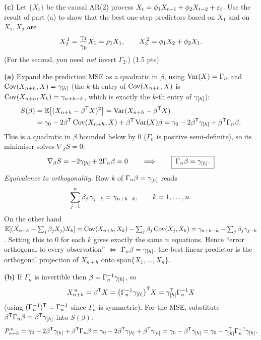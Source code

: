 \documentclass[11pt]{article}
\begin{document}
\textbf{(c)} Let $\{X_t\}$ be the causal AR(2) process $X_t=\phi_1 X_{t-1}+\phi_2 X_{t-2}+\varepsilon_t$. Use the result of part (a) to show that the best one-step predictors based on $X_1$ and on $X_1,X_2$ are
\[
X^{\,1}_2=\frac{\gamma_1}{\gamma_0}X_1=\rho_1 X_1,
\qquad
X^{\,2}_3=\phi_1 X_2+\phi_2 X_1 .
\]
(For the second, you need \emph{not} invert $\Gamma_2$.) \hfill(1.5 pts)
\statementend

\textbf{(a)} Expand the prediction MSE as a quadratic in $\beta$, using $\operatorname{Var}(X)=\Gamma_n$ and $\operatorname{Cov}(X_{n+h},X)=\gamma_{[h]}$ (the $k$-th entry of $\operatorname{Cov}(X_{n+h},X)$ is $\operatorname{Cov}(X_{n+h},X_k)=\gamma_{n+h-k}$, which is exactly the $k$-th entry of $\gamma_{[h]}$):
\[
\begin{aligned}
S(\beta)
&=\mathbb{E}\bigl[(X_{n+h}-\beta^{\mathsf{T}} X)^2\bigr]
=\operatorname{Var}(X_{n+h}-\beta^{\mathsf{T}} X)\\
&=\gamma_0-2\beta^{\mathsf{T}}\operatorname{Cov}(X_{n+h},X)+\beta^{\mathsf{T}}\operatorname{Var}(X)\beta
=\gamma_0-2\beta^{\mathsf{T}}\gamma_{[h]}+\beta^{\mathsf{T}}\Gamma_n\beta .
\end{aligned}
\]
This is a quadratic in $\beta$ bounded below by $0$ ($\Gamma_n$ is positive semi-definite), so its minimiser solves $\nabla_\beta S=0$:
\[
\nabla_\beta S=-2\gamma_{[h]}+2\Gamma_n\beta=0
\qquad\Longrightarrow\qquad
\boxed{\;\Gamma_n\beta=\gamma_{[h]}.\;}
\]
\emph{Equivalence to orthogonality.} Row $k$ of $\Gamma_n\beta=\gamma_{[h]}$ reads
\[
\sum_{j=1}^n\beta_j\,\gamma_{j-k}=\gamma_{n+h-k},\qquad k=1,\dots,n .
\]
On the other hand $\mathbb{E}[(X_{n+h}-\sum_j\beta_jX_j)X_k]=\operatorname{Cov}(X_{n+h},X_k)-\sum_j\beta_j\operatorname{Cov}(X_j,X_k)=\gamma_{n+h-k}-\sum_j\beta_j\gamma_{j-k}$. Setting this to $0$ for each $k$ gives exactly the same $n$ equations. Hence ``error orthogonal to every observation'' $\Longleftrightarrow$ $\Gamma_n\beta=\gamma_{[h]}$: the best linear predictor is the orthogonal projection of $X_{n+h}$ onto $\mathrm{span}\{X_1,\dots,X_n\}$.

\textbf{(b)} If $\Gamma_n$ is invertible then $\beta=\Gamma_n^{-1}\gamma_{[h]}$, so
\[
X^{\,n}_{n+h}=\beta^{\mathsf{T}} X=\bigl(\Gamma_n^{-1}\gamma_{[h]}\bigr)^{\mathsf{T}} X=\gamma_{[h]}^{\mathsf{T}}\Gamma_n^{-1}X
\]
(using $(\Gamma_n^{-1})^{\mathsf{T}}=\Gamma_n^{-1}$ since $\Gamma_n$ is symmetric). For the MSE, substitute $\beta^{\mathsf{T}}\Gamma_n\beta=\beta^{\mathsf{T}}\gamma_{[h]}$ into $S(\beta)$:
\[
P^{\,n}_{n+h}=\gamma_0-2\beta^{\mathsf{T}}\gamma_{[h]}+\beta^{\mathsf{T}}\Gamma_n\beta
=\gamma_0-2\beta^{\mathsf{T}}\gamma_{[h]}+\beta^{\mathsf{T}}\gamma_{[h]}
=\gamma_0-\beta^{\mathsf{T}}\gamma_{[h]}
=\gamma_0-\gamma_{[h]}^{\mathsf{T}}\Gamma_n^{-1}\gamma_{[h]} .
\]
\end{document}
